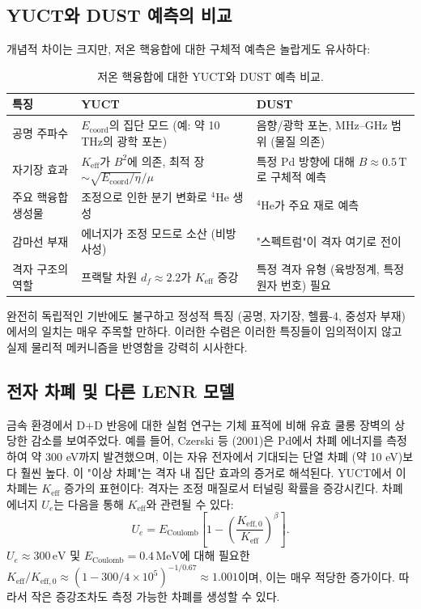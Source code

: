 \documentclass[11pt,a4paper]{article}
\theoremstyle{remark}
\newcommand{\Keff}{K_{\mathrm{eff}}}
\newcommand{\Keffzero}{K_{\mathrm{eff},0}}
\newcommand{\df}{d_{\!f}}
\begin{document}
	\subsection{YUCT와 DUST 예측의 비교}
	
	개념적 차이는 크지만, 저온 핵융합에 대한 구체적 예측은 놀랍게도 유사하다:
	
	\begin{table}[htbp]
		\centering
		\caption{저온 핵융합에 대한 YUCT와 DUST 예측 비교.}
		\label{tab:comparison}
		\small
		\begin{tabularx}{\textwidth}{l X X}
			\toprule
			\textbf{특징} & \textbf{YUCT} & \textbf{DUST} \\
			\midrule
			공명 주파수 & \(E_{\mathrm{coord}}\)의 집단 모드 (예: 약 10 THz의 광학 포논) & 음향/광학 포논, MHz–GHz 범위 (물질 의존) \\
			자기장 효과 & \(\Keff\)가 \(B^2\)에 의존, 최적 장 \(\sim \sqrt{E_{\mathrm{coord}}/\eta}/\mu\) & 특정 Pd 방향에 대해 \(B \approx 0.5\,\text{T}\)로 구체적 예측 \\
			주요 핵융합 생성물 & 조정으로 인한 분기 변화로 \(^4\)He 생성 & \(^4\)He가 주요 재로 예측 \\
			감마선 부재 & 에너지가 조정 모드로 소산 (비방사성) & "스펙트럼"이 격자 여기로 전이 \\
			격자 구조의 역할 & 프랙탈 차원 \(\df \approx 2.2\)가 \(\Keff\) 증강 & 특정 격자 유형 (육방정계, 특정 원자 번호) 필요 \\
			\bottomrule
		\end{tabularx}
	\end{table}
	
	완전히 독립적인 기반에도 불구하고 정성적 특징 (공명, 자기장, 헬륨-4, 중성자 부재)에서의 일치는 매우 주목할 만하다. 이러한 수렴은 이러한 특징들이 임의적이지 않고 실제 물리적 메커니즘을 반영함을 강력히 시사한다.
	
	\subsection{전자 차폐 및 다른 LENR 모델}
	
	금속 환경에서 D+D 반응에 대한 실험 연구는 기체 표적에 비해 유효 쿨롱 장벽의 상당한 감소를 보여주었다. 예를 들어, Czerski 등 (2001)은 Pd에서 차폐 에너지를 측정하여 약 300 eV까지 발견했으며, 이는 자유 전자에서 기대되는 단열 차폐 (약 10 eV)보다 훨씬 높다. 이 "이상 차폐"는 격자 내 집단 효과의 증거로 해석된다. YUCT에서 이 차폐는 \(\Keff\) 증가의 표현이다: 격자는 조정 매질로서 터널링 확률을 증강시킨다. 차폐 에너지 \(U_e\)는 다음을 통해 \(\Keff\)와 관련될 수 있다:
	\begin{equation}
		U_e = E_{\text{Coulomb}} \left[1 - \left(\frac{\Keffzero}{\Keff}\right)^{\beta}\right].
	\end{equation}
	\(U_e \approx 300\,\text{eV}\) 및 \(E_{\text{Coulomb}} = 0.4\,\text{MeV}\)에 대해 필요한 \(\Keff/\Keffzero \approx (1 - 300/4\times10^5)^{-1/0.67} \approx 1.001\)이며, 이는 매우 적당한 증가이다. 따라서 작은 증강조차도 측정 가능한 차폐를 생성할 수 있다.
	
\end{document}
